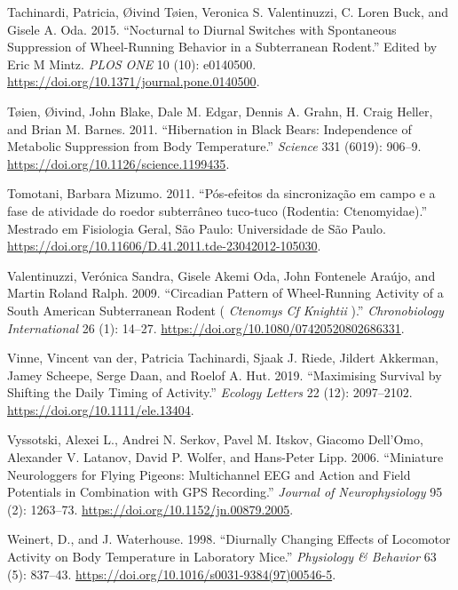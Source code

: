 \documentclass[msc,numbers,hidelinks]{coppe}
\newlength{\cslhangindent}
\newenvironment{cslreferences}%
  {\setlength{\parindent}{0pt}%
  \everypar{\setlength{\hangindent}{\cslhangindent}}\ignorespaces}%
  {\par}
\begin{document}
\begin{cslreferences}
  \leavevmode\hypertarget{ref-tachinardiNocturnalDiurnalSwitches2015}{}%
  Tachinardi, Patricia, Øivind Tøien, Veronica S. Valentinuzzi, C. Loren Buck, and Gisele A. Oda. 2015. ``Nocturnal to Diurnal Switches with Spontaneous Suppression of Wheel-Running Behavior in a Subterranean Rodent.'' Edited by Eric M Mintz. \emph{PLOS ONE} 10 (10): e0140500. \url{https://doi.org/10.1371/journal.pone.0140500}.

  \leavevmode\hypertarget{ref-toienHibernationBlackBears2011}{}%
  Tøien, Øivind, John Blake, Dale M. Edgar, Dennis A. Grahn, H. Craig Heller, and Brian M. Barnes. 2011. ``Hibernation in Black Bears: Independence of Metabolic Suppression from Body Temperature.'' \emph{Science} 331 (6019): 906--9. \url{https://doi.org/10.1126/science.1199435}.

  \leavevmode\hypertarget{ref-tomotaniPosefeitosSincronizacaoEm2011}{}%
  Tomotani, Barbara Mizumo. 2011. ``Pós-efeitos da sincronização em campo e a fase de atividade do roedor subterrâneo tuco-tuco (Rodentia: Ctenomyidae).'' Mestrado em Fisiologia Geral, São Paulo: Universidade de São Paulo. \url{https://doi.org/10.11606/D.41.2011.tde-23042012-105030}.

  \leavevmode\hypertarget{ref-valentinuzziCircadianPatternWheel2009}{}%
  Valentinuzzi, Verónica Sandra, Gisele Akemi Oda, John Fontenele Araújo, and Martin Roland Ralph. 2009. ``Circadian Pattern of Wheel-Running Activity of a South American Subterranean Rodent ( \emph{Ctenomys} \emph{Cf Knightii} ).'' \emph{Chronobiology International} 26 (1): 14--27. \url{https://doi.org/10.1080/07420520802686331}.

  \leavevmode\hypertarget{ref-vinneMaximisingSurvivalShifting2019}{}%
  Vinne, Vincent van der, Patricia Tachinardi, Sjaak J. Riede, Jildert Akkerman, Jamey Scheepe, Serge Daan, and Roelof A. Hut. 2019. ``Maximising Survival by Shifting the Daily Timing of Activity.'' \emph{Ecology Letters} 22 (12): 2097--2102. \url{https://doi.org/10.1111/ele.13404}.

  \leavevmode\hypertarget{ref-vyssotskiMiniatureNeurologgersFlying2006}{}%
  Vyssotski, Alexei L., Andrei N. Serkov, Pavel M. Itskov, Giacomo Dell'Omo, Alexander V. Latanov, David P. Wolfer, and Hans-Peter Lipp. 2006. ``Miniature Neurologgers for Flying Pigeons: Multichannel EEG and Action and Field Potentials in Combination with GPS Recording.'' \emph{Journal of Neurophysiology} 95 (2): 1263--73. \url{https://doi.org/10.1152/jn.00879.2005}.

  \leavevmode\hypertarget{ref-weinertDiurnallyChangingEffects1998}{}%
  Weinert, D., and J. Waterhouse. 1998. ``Diurnally Changing Effects of Locomotor Activity on Body Temperature in Laboratory Mice.'' \emph{Physiology \& Behavior} 63 (5): 837--43. \url{https://doi.org/10.1016/s0031-9384(97)00546-5}.


\end{cslreferences}
\end{document}
